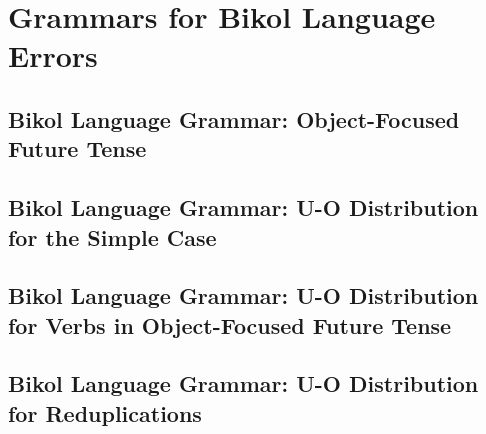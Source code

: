 \newpage
\section{Grammars for Bikol Language Errors}

\newpage
\subsection{Bikol Language Grammar: Object-Focused Future Tense}

\newpage
\subsection{Bikol Language Grammar: U-O Distribution for the Simple Case}

\newpage
\subsection{Bikol Language Grammar: U-O Distribution for Verbs in Object-Focused Future Tense}

\newpage
\subsection{Bikol Language Grammar: U-O Distribution for Reduplications}